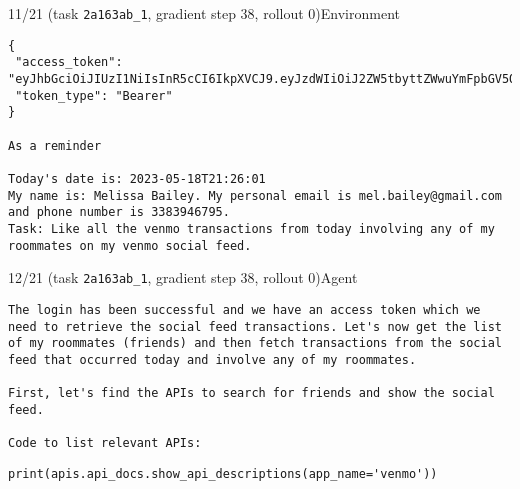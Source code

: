 \hspace*{8mm}%
\begin{minipage}{0.95\linewidth}
\begin{user_message_box}{{11/21 (task \texttt{2a163ab\_1}, gradient step 38, rollout 0)\hfill Environment}}
\scriptsize
\begin{Verbatim}[breaklines]
{
 "access_token": "eyJhbGciOiJIUzI1NiIsInR5cCI6IkpXVCJ9.eyJzdWIiOiJ2ZW5tbyttZWwuYmFpbGV5QGdtYWlsLmNvbSIsImV4cCI6MTY4NDQ0NjA1OX0.B34zBX595hORJCaftkDSSPtAddAftuFovXV_kaqBs9A",
 "token_type": "Bearer"
}

As a reminder

Today's date is: 2023-05-18T21:26:01
My name is: Melissa Bailey. My personal email is mel.bailey@gmail.com and phone number is 3383946795.
Task: Like all the venmo transactions from today involving any of my roommates on my venmo social feed.
\end{Verbatim}
\end{user_message_box}
\end{minipage}

\begin{minipage}{0.95\linewidth}
\begin{assistant_message_box}{{12/21 (task \texttt{2a163ab\_1}, gradient step 38, rollout 0)\hfill Agent}}
\scriptsize
\begin{Verbatim}[breaklines]
The login has been successful and we have an access token which we need to retrieve the social feed transactions. Let's now get the list of my roommates (friends) and then fetch transactions from the social feed that occurred today and involve any of my roommates.

First, let's find the APIs to search for friends and show the social feed.

Code to list relevant APIs:
\end{Verbatim}
\begin{tcolorbox}[colback=codebgcolor,boxrule=0pt]\begin{Verbatim}[breaklines]
print(apis.api_docs.show_api_descriptions(app_name='venmo'))
\end{Verbatim}
\end{tcolorbox}\end{assistant_message_box}
\end{minipage}

